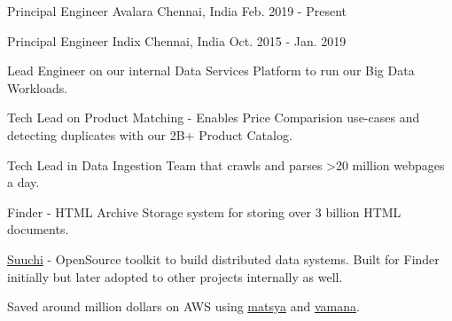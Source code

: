 

\begin{cventries}

  \cventry
    {Principal Engineer} %
    {Avalara} %
    {Chennai, India} %
    {Feb. 2019 - Present} %
    {
      \begin{cvitems} %
      \end{cvitems}
    }

  \cventry
    {Principal Engineer} %
    {Indix} %
    {Chennai, India} %
    {Oct. 2015 - Jan. 2019} %
    {
      \begin{cvitems} %
        \item {Lead Engineer on our internal Data Services Platform to run our Big Data Workloads. }
        \item {Tech Lead on Product Matching - Enables Price Comparision use-cases and detecting duplicates with our 2B+ Product Catalog. }
        \item {Tech Lead in Data Ingestion Team that crawls and parses >20 million webpages a day. }
        \item {Finder - HTML Archive Storage system for storing over 3 billion HTML documents.}
        \item {\href{https://github.com/ashwanthkumar/suuchi}{Suuchi} - OpenSource toolkit to build distributed data systems. Built for Finder initially but later adopted to other projects internally as well. }
        \item {Saved around million dollars on AWS using \href{https://github.com/indix/matsya}{matsya} and \href{https://github.com/indix/vamana}{vamana}. }
      \end{cvitems}
    }


\end{cventries}
